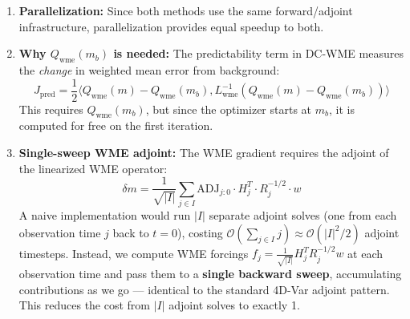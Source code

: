 \documentclass[11pt]{article}
\newcommand{\mb}{m_b}
\newcommand{\Rsqrtinv}{R^{-1/2}}
\newcommand{\Lwme}{L_{\text{wme}}}
\newcommand{\Qwme}{Q_{\text{wme}}}
\begin{document}
\begin{enumerate}
    \item \textbf{Parallelization:} Since both methods use the same forward/adjoint infrastructure, parallelization provides equal speedup to both.

    \item \textbf{Why $\Qwme(\mb)$ is needed:} The predictability term in DC-WME measures the \textit{change} in weighted mean error from background:
    \begin{equation}
    J_{\text{pred}} = \frac{1}{2}\langle \Qwme(m) - \Qwme(\mb), \Lwme^{-1}(\Qwme(m) - \Qwme(\mb))\rangle
    \end{equation}
    This requires $\Qwme(\mb)$, but since the optimizer starts at $\mb$, it is computed for free on the first iteration.

    \item \textbf{Single-sweep WME adjoint:} The WME gradient requires the adjoint of the linearized WME operator:
    \begin{equation}
    \delta m = \frac{1}{\sqrt{|I|}} \sum_{j \in I} \text{ADJ}_{j:0} \cdot H_j^T \cdot \Rsqrtinv_j \cdot w
    \end{equation}
    A naive implementation would run $|I|$ separate adjoint solves (one from each observation time $j$ back to $t=0$), costing $\mathcal{O}(\sum_{j \in I} j) \approx \mathcal{O}(|I|^2/2)$ adjoint timesteps. Instead, we compute WME forcings $f_j = \frac{1}{\sqrt{|I|}} H_j^T \Rsqrtinv_j w$ at each observation time and pass them to a \textbf{single backward sweep}, accumulating contributions as we go --- identical to the standard 4D-Var adjoint pattern. This reduces the cost from $|I|$ adjoint solves to exactly 1.
\end{enumerate}
\end{document}
